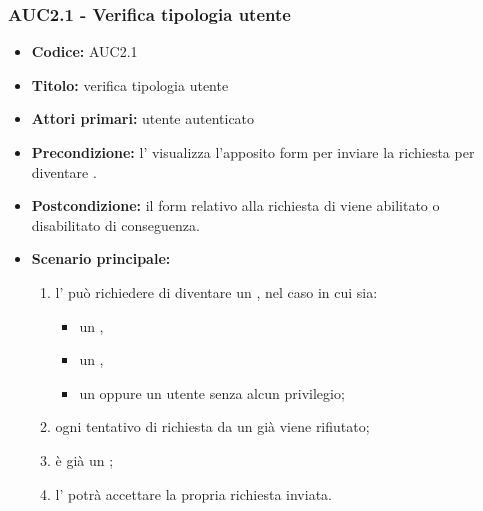 \documentclass[casi-duso]{subfiles}
\begin{document}
\subsubsection{AUC2.1 - Verifica tipologia utente}%
\label{subsub:AUC2.1}
\begin{itemize}
  \item \textbf{Codice:} AUC2.1
  \item \textbf{Titolo:} verifica tipologia utente
  \item \textbf{Attori primari:} utente autenticato
  \item \textbf{Precondizione:} l' visualizza l'apposito form per inviare la richiesta per diventare .
  \item \textbf{Postcondizione:} il form relativo alla richiesta di  viene abilitato o disabilitato di conseguenza.
  \item \textbf{Scenario principale:}
  \begin{enumerate}
    \item l' può richiedere di diventare un , nel caso in cui sia:
    \begin{itemize}
      \item un ,
      \item un ,
      \item un  oppure un utente senza alcun privilegio;
    \end{itemize}
    \item ogni tentativo di richiesta da un già  viene rifiutato;
    \item {} è già un ;
    \item l' potrà accettare la propria richiesta inviata.
  \end{enumerate}
\end{itemize}
\end{document}
